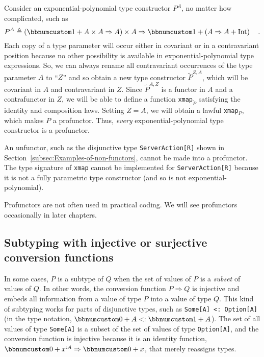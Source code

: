 Consider an exponential-polynomial type constructor $P^{A}$, no matter
how complicated, such as
\[
P^{A}\triangleq\left(\bbnum 1+A\times A\Rightarrow A\right)\times A\Rightarrow\bbnum 1+\left(A\Rightarrow A+\text{Int}\right)\quad.
\]
Each copy of a type parameter will occur either in covariant or in
a contravariant position because no other possibility is available
in exponential-polynomial type expressions. So, we can always rename
all contravariant occurrences of the type parameter $A$ to ``$Z$''
and so obtain a new type constructor $\tilde{P}^{Z,A}$, which will
be covariant in $A$ and contravariant in $Z$. Since $\tilde{P}^{A,Z}$
is a functor in $A$ and a contrafunctor in $Z$, we will be able
to define a function \lstinline!xmap!$_{\tilde{P}}$ satisfying the
identity and composition laws. Setting $Z=A$, we will obtain a lawful
\lstinline!xmap!$_{P}$, which makes $P$ a profunctor. Thus, \emph{every}
exponential-polynomial type constructor is a profunctor.

An unfunctor, such as the disjunctive type \lstinline!ServerAction[R]!
shown in Section~\ref{subsec:Examples-of-non-functors}, cannot be
made into a profunctor. The type signature of \lstinline!xmap! cannot
be implemented for \lstinline!ServerAction[R]! because it is not
a fully parametric type constructor (and so is not exponential-polynomial).

Profunctors are not often used in practical coding. We will see profunctors
occasionally in later chapters.

\subsection{Subtyping with injective or surjective conversion functions}

In some cases, $P$ is a subtype of $Q$ when the set of values of
$P$ is a \emph{subset} of values of $Q$. In other words, the conversion
function $P\Rightarrow Q$ is injective and embeds all information
from a value of type $P$ into a value of type $Q$. This kind of
subtyping works for parts of disjunctive types, such as \lstinline!Some[A] <: Option[A]!
(in the type notation, $\bbnum 0+A<:\bbnum 1+A$). The set of all
values of type \lstinline!Some[A]! is a subset of the set of values
of type \lstinline!Option[A]!, and the conversion function is injective
because it is an identity function, $\bbnum 0+x^{:A}\Rightarrow\bbnum 0+x$,
that merely reassigns types.

